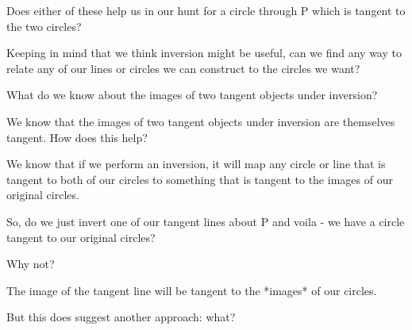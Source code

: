 Does either of these help us in our hunt for a circle through P which is tangent to the two circles?

Keeping in mind that we think inversion might be useful, can we find any way to relate any of our lines or circles we can construct to the circles we want?

What do we know about the images of two tangent objects under inversion?



We know that the images of two tangent objects under inversion are themselves tangent.  How does this help?

We know that if we perform an inversion, it will map any circle or line that is tangent to both of our circles to something that is tangent to the images of our original circles.

So, do we just invert one of our tangent lines about P and voila - we have a circle tangent to our original circles?


Why not?


The image of the tangent line will be tangent to the *images* of our circles.

But this does suggest another approach: what?



